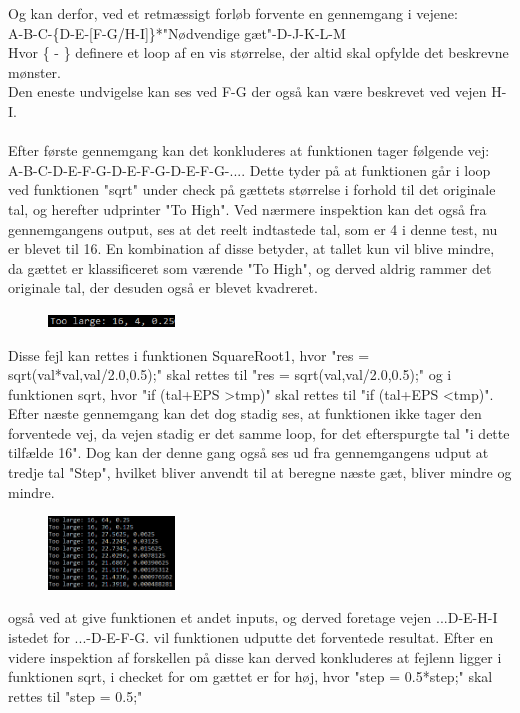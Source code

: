 \documentclass[11pt]{article}
\begin{document}
    \noindent
    Og kan derfor, ved et retmæssigt forløb forvente en gennemgang i vejene:\\
    A-B-C-\{D-E-[F-G/H-I]\}*"Nødvendige gæt"-D-J-K-L-M\\
    Hvor \{ - \} definere et loop af en vis størrelse, der altid skal opfylde det beskrevne mønster.\\
    Den eneste undvigelse kan ses ved F-G der også kan være beskrevet ved vejen H-I.\\
    \\
    Efter første gennemgang kan det konkluderes at funktionen tager følgende vej:\\
    A-B-C-D-E-F-G-D-E-F-G-D-E-F-G-.... Dette tyder på at funktionen går i loop ved funktionen "sqrt" under check på gættets størrelse i forhold til det originale tal, og herefter udprinter "To High".
    Ved nærmere inspektion kan det også fra gennemgangens output, ses at det reelt indtastede tal, som er 4 i denne test, nu er blevet til 16. En kombination af disse betyder, at tallet kun vil blive mindre, da gættet er klassificeret som værende "To High", og derved aldrig rammer det originale tal, der desuden også er blevet kvadreret.
    \begin{figure}[H]
        \includegraphics[width=0.3\textwidth,angle=0]{Struktureret_System_Udvikling/Workshop_3/Udklip.PNG}
        \label{fig:Udklip}
    \end{figure}
    \noindent
    Disse fejl kan rettes i funktionen SquareRoot1, hvor "res = sqrt(val*val,val/2.0,0.5);" skal rettes til "res = sqrt(val,val/2.0,0.5);" og i funktionen sqrt, hvor "if (tal+EPS \textgreater tmp)" skal rettes til "if (tal+EPS \textless tmp)".
    Efter næste gennemgang kan det dog stadig ses, at funktionen ikke tager den forventede vej, da vejen stadig er det samme loop, for det efterspurgte tal "i dette tilfælde 16". Dog kan der denne gang også ses ud fra gennemgangens udput at tredje tal "Step", hvilket bliver anvendt til at beregne næste gæt, bliver mindre og mindre.
    \begin{figure}[H]
        \includegraphics[width=0.3\textwidth,angle=0]{Struktureret_System_Udvikling/Workshop_3/Udklip2.PNG}
        \label{fig:Udklip2}
    \end{figure}
    \noindent
    også ved at give funktionen et andet inputs, og derved foretage vejen ...D-E-H-I istedet for ...-D-E-F-G. vil funktionen udputte det forventede resultat.
    Efter en videre inspektion af forskellen på disse kan derved konkluderes at fejlenn ligger i funktionen sqrt, i checket for om gættet er for høj, hvor "step = 0.5*step;" skal rettes til "step = 0.5;"
    
\end{document}
